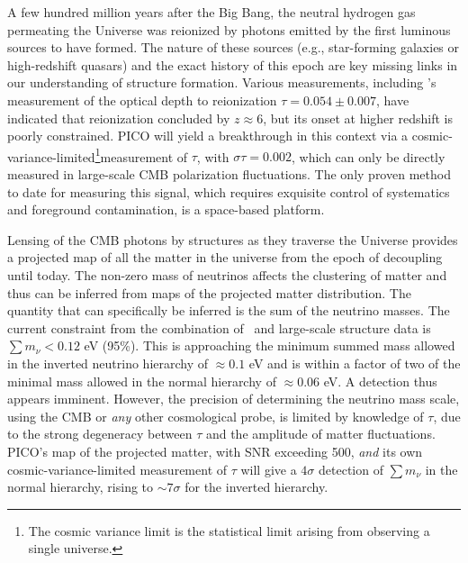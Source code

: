 \documentclass[PICOReport.tex]{subfiles}
\begin{document}
A few hundred million years after the Big Bang, the neutral hydrogen gas permeating the Universe was reionized by photons emitted by the first luminous sources to have formed.  The nature of these sources (e.g., star-forming galaxies or high-redshift quasars) and the exact history of this epoch are key missing links in our understanding of structure formation.  Various measurements, including \planck 's measurement of the optical depth to reionization $\tau = 0.054 \pm 0.007$, have indicated that reionization concluded by $z \approx 6$, but its onset at higher redshift is poorly constrained. PICO will yield a breakthrough in this context via a cosmic-variance-limited\footnote{The cosmic variance limit is the statistical limit arising from observing a single universe.}measurement of $\tau$, with $\sigma{\tau}=0.002$, which can only be directly measured in large-scale CMB polarization fluctuations.  The only proven method to date for measuring this signal, which requires exquisite control of systematics and foreground contamination, is a space-based platform.

Lensing of the CMB photons by structures as they traverse the Universe provides a projected map of all the matter in the universe from the epoch of decoupling until today.  The non-zero mass of neutrinos affects the clustering of matter and thus can be inferred from maps of the projected matter distribution. The quantity that can specifically be inferred is the sum of the neutrino masses.  The current constraint from the combination of \planck\ and large-scale structure data is $\sum m_{\nu} < 0.12$ eV (95\%).  This is approaching the minimum summed mass allowed in the inverted neutrino hierarchy of $\approx 0.1$ eV and is within a factor of two of the minimal mass allowed in the normal hierarchy of $\approx 0.06$ eV.  A detection thus appears imminent.  However, the precision of determining the neutrino mass scale, using the CMB or {\it any} other cosmological probe, is limited by knowledge of $\tau$, due to the strong degeneracy between $\tau$ and the amplitude of matter fluctuations.  PICO's map of the projected matter, with \ac{SNR} exceeding 500, {\it and} its own cosmic-variance-limited measurement of $\tau$ will give a $4\sigma$ detection of $\sum m_{\nu}$ in the normal hierarchy, rising to $\sim7\sigma$ for the inverted hierarchy. 

\end{document}
